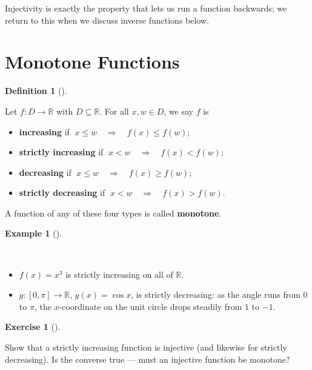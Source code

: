 \documentclass[
  letterpaper,
  DIV=11,
  numbers=noendperiod]{scrreprt}
\providecommand{\tightlist}{%
  \setlength{\itemsep}{0pt}\setlength{\parskip}{0pt}}
\theoremstyle{plain}
\theoremstyle{plain}
\theoremstyle{definition}
\newtheorem{definition}{Definition}[chapter]
\theoremstyle{definition}
\newtheorem{exercise}{Exercise}[chapter]
\theoremstyle{definition}
\newtheorem{example}{Example}[chapter]
\theoremstyle{plain}
\theoremstyle{plain}
\theoremstyle{remark}
\begin{document}
Injectivity is exactly the property that lets us run a function
backwards; we return to this when we discuss inverse functions below.

\section{Monotone Functions}\label{monotone-functions}

\begin{definition}[]\protect\hypertarget{def-monotone}{}\label{def-monotone}

\hfill\break
Let \(f\colon D\to\mathbb{R}\) with \(D\subseteq\mathbb{R}\). For all
\(x,w\in D\), we say \(f\) is

\begin{itemize}
\tightlist
\item
  \textbf{increasing} if
  \(\;x\le w \quad \Rightarrow \quad f(x)\le f(w)\);
\item
  \textbf{strictly increasing} if
  \(\;x < w \quad \Rightarrow \quad f(x) < f(w)\);
\item
  \textbf{decreasing} if
  \(\;x\le w \quad \Rightarrow \quad f(x)\ge f(w)\);
\item
  \textbf{strictly decreasing} if
  \(\;x < w \quad \Rightarrow \quad f(x) > f(w)\).
\end{itemize}

A function of any of these four types is called \textbf{monotone}.

\end{definition}

\begin{example}[]\protect\hypertarget{exm-monotone}{}\label{exm-monotone}

~

\begin{itemize}
\tightlist
\item
  \(f(x)=x^3\) is strictly increasing on all of \(\mathbb{R}\).
\item
  \(g\colon[0,\pi]\to\mathbb{R}\), \(g(x)=\cos x\), is strictly
  decreasing: as the angle runs from \(0\) to \(\pi\), the
  \(x\)-coordinate on the unit circle drops steadily from \(1\) to
  \(-1\).
\end{itemize}

\end{example}

\begin{exercise}[]\protect\hypertarget{exr-strict-mono-injective}{}\label{exr-strict-mono-injective}

Show that a strictly increasing function is injective (and likewise for
strictly decreasing). Is the converse true --- must an injective
function be monotone?

\end{exercise}
\end{document}
